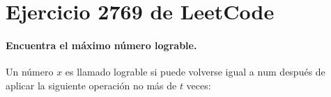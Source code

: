 \documentclass{article}
\author{Adolfo Lobmeyr Castro}
\begin{document}
\section{Ejercicio 2769 de LeetCode}
\paragraph{Encuentra el m\'aximo n\'umero lograble.} Un n\'umero $x$ es llamado lograble si puede volverse igual a $\text{num}$ despu\'es de aplicar la siguiente operaci\'on no m\'as de $t$ veces:
\end{document}
